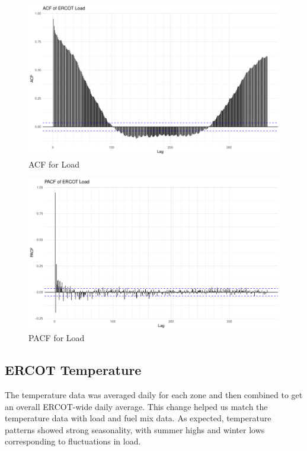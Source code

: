 \documentclass[
]{article}
\begin{document}
\begin{figure}
\centering
\includegraphics{FinalProject_Report_files/figure-latex/Load ACF-1.pdf}
\caption{ACF for Load}
\end{figure}

\begin{figure}
\centering
\includegraphics{FinalProject_Report_files/figure-latex/Load PACF-1.pdf}
\caption{PACF for Load}
\end{figure}

\newpage

\subsection{ERCOT Temperature}\label{ercot-temperature}

The temperature data was averaged daily for each zone and then combined
to get an overall ERCOT-wide daily average. This change helped us match
the temperature data with load and fuel mix data. As expected,
temperature patterns showed strong seasonality, with summer highs and
winter lows corresponding to fluctuations in load.
\end{document}
